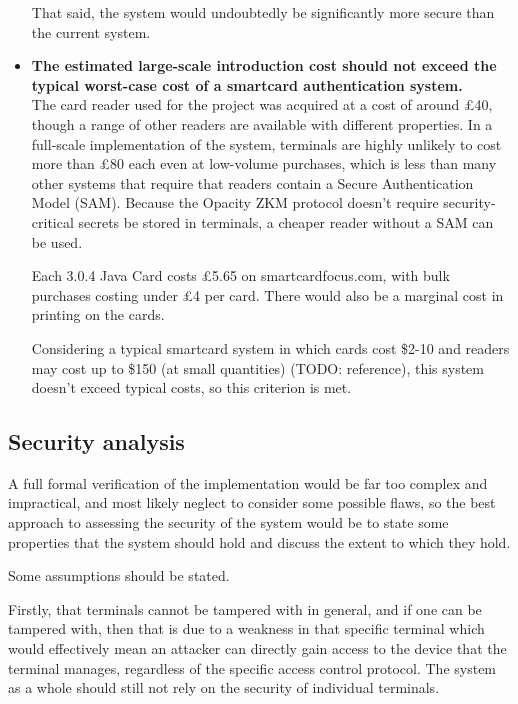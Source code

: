 \documentclass[12pt]{article}
\begin{document}
\begin{itemize}
	That said, the system would undoubtedly be significantly more secure than the current system.
	
	
	\item \textbf{The estimated large-scale introduction cost should not exceed the typical worst-case cost of a smartcard authentication system.}\\
	The card reader used for the project was acquired at a cost of around \pounds 40, though a range of other readers are available with different properties. In a full-scale implementation of the system, terminals are highly unlikely to cost more than \pounds 80 each even at low-volume purchases, which is less than many other systems that require that readers contain a Secure Authentication Model (SAM). Because the Opacity ZKM protocol doesn't require security-critical secrets be stored in terminals, a cheaper reader without a SAM can be used.
	
	Each 3.0.4 Java Card costs \pounds 5.65 on smartcardfocus.com, with bulk purchases costing under \pounds 4 per card. There would also be a marginal cost in printing on the cards.
	
	Considering a typical smartcard system in which cards cost \$2-10 and readers may cost up to \$150 (at small quantities) (TODO: reference), this system doesn't exceed typical costs, so this criterion is met.
	
\end{itemize}


\subsection{Security analysis}
\label{sec:security_analysis}

A full formal verification of the implementation would be far too complex and impractical, and most likely neglect to consider some possible flaws, so the best approach to assessing the security of the system would be to state some properties that the system should hold and discuss the extent to which they hold.

Some assumptions should be stated.

Firstly, that terminals cannot be tampered with in general, and if one can be tampered with, then that is due to a weakness in that specific terminal which would effectively mean an attacker can directly gain access to the device that the terminal manages, regardless of the specific access control protocol. The system as a whole should still not rely on the security of individual terminals.
\end{document}

